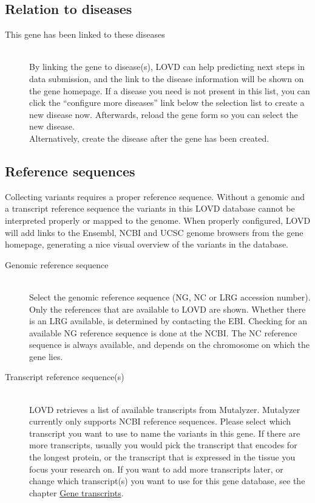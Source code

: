\documentclass[a4paper,oneside,openany,12pt]{memoir}
\begin{document}
\subsection{Relation to diseases}
\begin{description}
  \item[This gene has been linked to these diseases] \hfill \\
  By linking the gene to disease(s), LOVD can help predicting next steps in data submission,
   and the link to the disease information will be shown on the gene homepage.
  If a disease you need is not present in this list, you can click the
   ``configure more diseases'' link below the selection list to create a new disease now.
  Afterwards, reload the gene form so you can select the new disease.
  \\
  Alternatively, create the disease after the gene has been created.
\end{description}



\subsection{Reference sequences}
Collecting variants requires a proper reference sequence.
Without a genomic and a transcript reference sequence the variants in this LOVD database cannot be interpreted properly or mapped to the genome.
When properly configured, LOVD will add links to the Ensembl, NCBI and UCSC genome browsers from the gene homepage, generating a nice visual overview of the variants in the database.
\begin{description}
  \item[Genomic reference sequence] \hfill \\
  Select the genomic reference sequence (NG, NC or LRG accession number).
  Only the references that are available to LOVD are shown.
  Whether there is an LRG available, is determined by contacting the EBI.
  Checking for an available NG reference sequence is done at the NCBI.
  The NC reference sequence is always available, and depends on the chromosome on which the gene lies.
  \item[Transcript reference sequence(s)] \hfill \\
  LOVD retrieves a list of available transcripts from Mutalyzer.
  Mutalyzer currently only supports NCBI reference sequences.
  Please select which transcript you want to use to name the variants in this gene.
  If there are more transcripts, usually you would pick the transcript that encodes for the longest protein,
   or the transcript that is expressed in the tissue you focus your research on.
  If you want to add more transcripts later, or change which transcript(s) you want to use
   for this gene database, see the chapter \hyperlink{c_transcripts}{Gene transcripts}.
\end{description}
\end{document}
